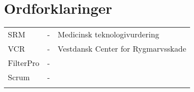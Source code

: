 
\chapter{Ordforklaringer}

\begin{table}[H]
\center
{}
\begin{tabularx}{\linewidth}{l l X}	
SRM         & - &   Medicinsk teknologivurdering \\ \addlinespace[2mm]
VCR         & - &   Vestdansk Center for Rygmarvsskade \\ \addlinespace[2mm]
FilterPro  & - &   \\ \addlinespace[2mm]
Scrum & - &   \\ \addlinespace[2mm]
\end{tabularx}
\end{table}


